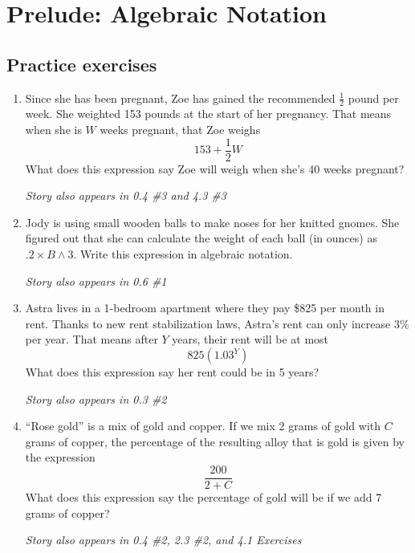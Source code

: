 
\section{Prelude: Algebraic Notation} 

\subsection*{Practice exercises}

\begin{enumerate}

\item Since she has been pregnant, Zoe has gained the recommended $\frac{1}{2}$ pound per week. She weighted 153 pounds at the start of her pregnancy.  That means when she is $W$ weeks pregnant, that Zoe weighs $$153 + \frac{1}{2}W$$
What does this expression say Zoe will weigh when she's 40 weeks pregnant? 

\hfill \emph{Story also appears in 0.4 \#3  and 4.3 \#3} \vfill

\item Jody is using small wooden balls to make noses for her knitted gnomes.  She figured out that she can calculate the weight of each ball (in ounces) as $.2 \times B \land 3$.  Write this expression in algebraic notation. 

\hfill \emph{Story also appears in 0.6 \#1}
\vfill

\newpage %

\item Astra lives in a 1-bedroom apartment where they pay \$825 per month in rent. Thanks to new rent stabilization laws, Astra's rent can only increase 3\% per year.  That means after $Y$ years, their rent will be at most $$825(1.03^Y)$$  What does this expression say her rent could be in 5 years? 

\hfill \emph{Story also appears in 0.3 \#2} \vfill

\item  ``Rose gold'' is a mix of gold and copper.  If we mix 2 grams of gold with $C$ grams of copper, the percentage of the resulting alloy that is gold is given by the expression $$\frac{200}{2 +C}$$
What does this expression say the percentage of gold will be if we add 7 grams of copper?

 \hfill \emph{Story also appears in 0.4 \#2, 2.3 \#2, and 4.1 Exercises} \vfill

\end{enumerate}

\newpage %

